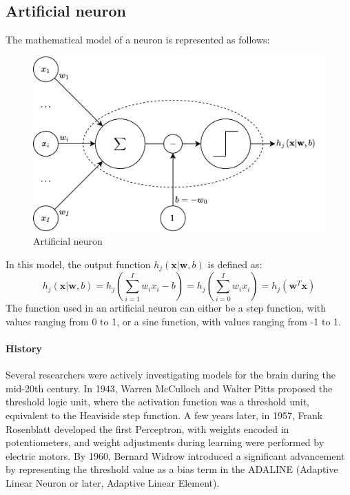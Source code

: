 \subsection{Artificial neuron}
The mathematical model of a neuron is represented as follows:
\begin{figure}[H]
    \centering
    \includegraphics[width=0.75\linewidth]{images/neuron.png}
    \caption{Artificial neuron}
\end{figure}
In this model, the output function $h_j(\mathbf{x}|\mathbf{w},b)$ is defined as:
\[h_j(\mathbf{x}|\mathbf{w},b)=h_j\left(\sum_{i=1}^Iw_ix_i-b\right)=h_j\left(\sum_{i=0}^Iw_ix_i\right)=h_j\left(\mathbf{w}^T\mathbf{x}\right)\]
The function used in an artificial neuron can either be a step function, with values ranging from 0 to 1, or a sine function, with values ranging from -1 to 1.

\paragraph*{History}
Several researchers were actively investigating models for the brain during the mid-20th century. 
In 1943, Warren McCulloch and Walter Pitts proposed the threshold logic unit, where the activation function was a threshold unit, equivalent to the Heaviside step function. 
A few years later, in 1957, Frank Rosenblatt developed the first Perceptron, with weights encoded in potentiometers, and weight adjustments during learning were performed by electric motors. 
By 1960, Bernard Widrow introduced a significant advancement by representing the threshold value as a bias term in the ADALINE (Adaptive Linear Neuron or later, Adaptive Linear Element). 

